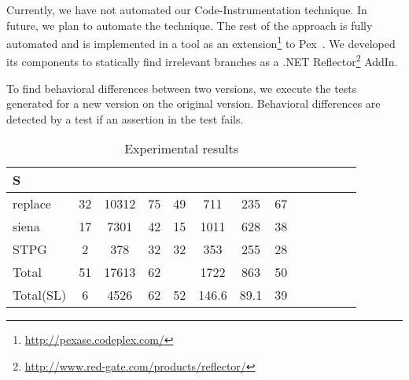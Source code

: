 Currently, we have not automated our Code-Instrumentation technique. In future, we plan to automate the technique.  
The rest of the approach is fully automated and is implemented in a tool as an extension\footnote{\url{http://pexase.codeplex.com/}} to Pex~\cite{Pex}. We developed its components to statically find irrelevant branches as a .NET Reflector\footnote{\url{http://www.red-gate.com/products/reflector/}} AddIn.

To find behavioral differences between two versions, we execute the tests generated for a new version on the original version.
Behavioral differences are detected by a test if an assertion in the test fails. 
\begin{table}
\begin{CodeOut}
\begin{center}
\vspace{-1cm}
\caption {\label{table:all_results}\scriptsize{Experimental results}}
\begin {tabular} {|l|c|c|c|c|c|c|c|c|c|c|c|c|}
\hline
S &\CenterCell{V} %
&\CenterCell{$P_{\CodeIn{Pex}}$}&\CenterCell{$P_{Red}(\%)$}
&\CenterCell{$M_p$}
&\CenterCell{$Tp_{\CodeIn{Pex}}$}&\CenterCell{$Ts$+ $T_d$}&\CenterCell{$Tp_{Red}(\%)$}
\\

\hline
replace	&32		&		10312	&	75	&	49		&		711	& 235	&		67	 \\ \hline
siena		&17		&		7301	&	42	&	15	&		1011	& 628&	38			\\ \hline
STPG		&2		&		378		&	32	&	32		&		353	&	255	& 28\\ \hline
Total		&51		&		17613	&	62		&			&		1722	&		863	& 50\\
\hline
Total(SL)&		6		&4526			&62		&52			&146.6&	89.1	&39\\


\end{tabular}
\end{center}
\end{CodeOut}
\end{table}
